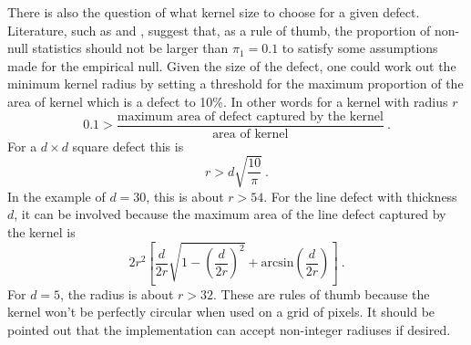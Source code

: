 There is also the question of what kernel size to choose for a given defect. Literature, such as \cite{efron2004large} and \cite{schwartzman2008empirical}, suggest that, as a rule of thumb, the proportion of non-null statistics should not be larger than $\pi_1=0.1$ to satisfy some assumptions made for the empirical null. Given the size of the defect, one could work out the minimum kernel radius by setting a threshold for the maximum proportion of the area of kernel which is a defect to 10\%. In other words for a kernel with radius $r$
\begin{equation}
0.1 > \dfrac{\text{maximum area of defect captured by the kernel}}{\text{area of kernel}} \ .
\end{equation}
For a $d \times d$ square defect this is
\begin{equation}
r > d \sqrt{\dfrac{10}{\pi}} \ .
\end{equation}
In the example of $d=30$, this is about $r>54$. For the line defect with thickness $d$, it can be involved because the maximum area of the line defect captured by the kernel is
\begin{equation}
2r^2
\left[
  \dfrac{d}{2r}\sqrt{1-\left(\dfrac{d}{2r}\right)^2}
  +\text{arcsin}\left(\dfrac{d}{2r}\right)
\right] \ .
\end{equation}
For $d=5$, the radius is about $r>32$. These are rules of thumb because the kernel won't be perfectly circular when used on a grid of pixels. It should be pointed out that the implementation can accept non-integer radiuses if desired.

